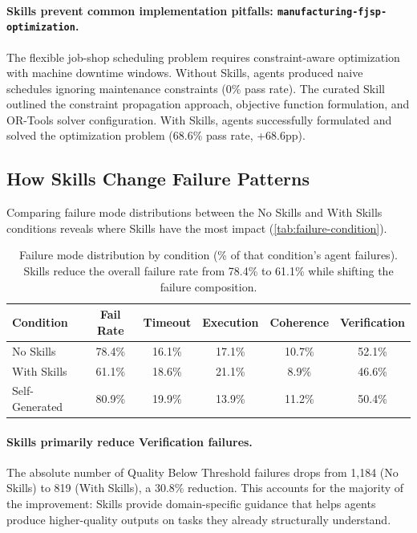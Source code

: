 \paragraph{Skills prevent common implementation pitfalls: \texttt{manufacturing-fjsp-optimization}.}
The flexible job-shop scheduling problem requires constraint-aware optimization with machine downtime windows. Without Skills, agents produced naive schedules ignoring maintenance constraints (0\% pass rate). The curated Skill outlined the constraint propagation approach, objective function formulation, and OR-Tools solver configuration. With Skills, agents successfully formulated and solved the optimization problem (68.6\% pass rate, +68.6pp).


\subsection{How Skills Change Failure Patterns}
\label{app:skill-impact-failures}

Comparing failure mode distributions between the No Skills and With Skills conditions reveals where Skills have the most impact (\autoref{tab:failure-condition}).

\begin{table}[htb]
\centering
\small
\caption{Failure mode distribution by condition (\% of that condition's agent failures). Skills reduce the overall failure rate from 78.4\% to 61.1\% while shifting the failure composition.}
\label{tab:failure-condition}
\begin{tabular}{lccccc}
\toprule
\textbf{Condition} & \textbf{Fail Rate} & \textbf{Timeout} & \textbf{Execution} & \textbf{Coherence} & \textbf{Verification} \\
\midrule
No Skills & 78.4\% & 16.1\% & 17.1\% & 10.7\% & 52.1\% \\
With Skills & 61.1\% & 18.6\% & 21.1\% & 8.9\% & 46.6\% \\
Self-Generated & 80.9\% & 19.9\% & 13.9\% & 11.2\% & 50.4\% \\
\bottomrule
\end{tabular}
\end{table}

\paragraph{Skills primarily reduce Verification failures.}
The absolute number of Quality Below Threshold failures drops from 1,184 (No Skills) to 819 (With Skills), a 30.8\% reduction. This accounts for the majority of the improvement: Skills provide domain-specific guidance that helps agents produce higher-quality outputs on tasks they already structurally understand.

